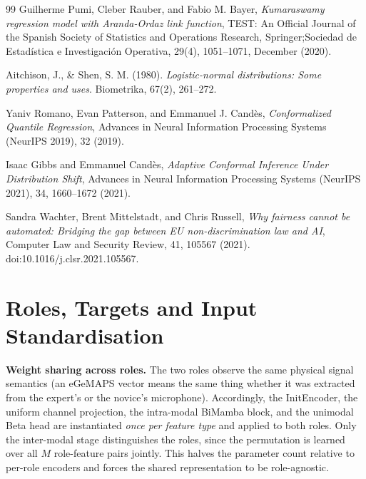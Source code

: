 \documentclass[10pt,a4paper,twocolumn]{article}
\begin{document}
\begin{thebibliography}{99}
		Guilherme Pumi, Cleber Rauber, and Fabio M. Bayer, \emph{Kumaraswamy regression model with Aranda-Ordaz link function}, TEST: An Official Journal of the Spanish Society of Statistics and Operations Research, Springer;Sociedad de Estadística e Investigación Operativa, 29(4), 1051--1071, December (2020).
		
		Aitchison, J., \& Shen, S. M. (1980). \emph{Logistic-normal distributions: Some properties and uses}. Biometrika, 67(2), 261--272.
		
		Yaniv Romano, Evan Patterson, and Emmanuel J. Candès, \emph{Conformalized Quantile Regression}, Advances in Neural Information Processing Systems (NeurIPS 2019), 32 (2019).
		
		Isaac Gibbs and Emmanuel Candès, \emph{Adaptive Conformal Inference Under Distribution Shift}, Advances in Neural Information Processing Systems (NeurIPS 2021), 34, 1660--1672 (2021).
		
		Sandra Wachter, Brent Mittelstadt, and Chris Russell, \emph{Why fairness cannot be automated: Bridging the gap between EU non-discrimination law and AI}, Computer Law and Security Review, 41, 105567 (2021). doi:10.1016/j.clsr.2021.105567.
	\end{thebibliography}

	\onecolumn
	\appendix
	\section{Roles, Targets and Input Standardisation}
	\label{app:roles}
	\textbf{Weight sharing across roles.} The two roles observe the same physical signal semantics (an eGeMAPS vector means the same thing whether it was extracted from the expert's or the novice's microphone). Accordingly, the InitEncoder, the uniform channel projection, the intra-modal BiMamba block, and the unimodal Beta head are instantiated \emph{once per feature type} and applied to both roles. Only the inter-modal stage distinguishes the roles, since the permutation is learned over all $M$ role-feature pairs jointly. This halves the parameter count relative to per-role encoders and forces the shared representation to be role-agnostic.
\end{document}
